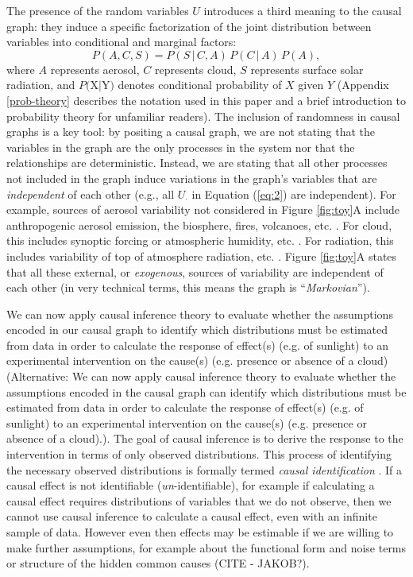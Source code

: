 \documentclass[12pt]{article}
\begin{document}
The presence of the random variables $U$ introduces a third meaning to
the causal graph: they induce a specific factorization of the joint
distribution between variables into conditional and marginal factors:
\begin{equation}
  P(A, C, S) = P(S \, | \,C, A) \, P(C \, | \, A) \, P(A),
\end{equation}
where $A$ represents aerosol, $C$ represents cloud, $S$ represents
surface solar radiation, and $P($X$ | $Y$)$ denotes conditional
probability of $X$ given $Y$ (Appendix \ref{prob-theory} describes the notation used in
this paper and a brief introduction to probability theory for
unfamiliar readers). The inclusion of randomness in causal graphs is a
key tool: by positing a causal graph, we are not stating that the
variables in the graph are the only processes in the system nor that the relationships are deterministic. Instead,
we are stating that all other processes not included in the graph
induce variations in the graph's variables that are \emph{independent} of
each other (e.g., all $U_{\cdot}$ in Equation (\ref{eq:2}) are
independent). For example, sources of aerosol variability not
considered in Figure \ref{fig:toy}A include anthropogenic aerosol
emission, the biosphere, fires, volcanoes,
etc. \citep[e.g.,][]{Boucher2015}. For cloud, this includes synoptic
forcing or atmospheric humidity,
etc. \citep[e.g.,][]{wallace2006atmospheric}. For radiation, this
includes variability of top of atmosphere radiation,
etc. \citep[e.g.,][]{hartmann2015global}. Figure \ref{fig:toy}A states
that all these external, or \textit{exogenous}, sources of variability
are independent of each other (in very technical terms, this means the
graph is ``\textit{Markovian}'').

We can now apply causal inference theory
\citep[e.g.,][]{pearl1995causal,shpitser2006} to evaluate whether the
assumptions encoded in our causal graph to identify which
distributions must be estimated from data in order to calculate the
response of effect(s) (e.g. of sunlight) to an experimental
intervention on the cause(s) (e.g. presence or absence of a cloud)
(Alternative: We can now apply causal inference theory
\citep[e.g.,][]{pearl1995causal,tian2002general} to evaluate whether
the assumptions encoded in the causal graph can identify which
distributions must be estimated from data in order to calculate the
response of effect(s) (e.g. of sunlight) to an experimental
intervention on the cause(s) (e.g. presence or absence of a
cloud).). The goal of causal inference is to derive the response to
the intervention in terms of only observed distributions. This process
of identifying the necessary observed distributions is formally termed
\emph{causal identification} \citep[][, Ch. 3]{pearl2009causality}. If
a causal effect is not identifiable (\emph{un}-identifiable), for
example if calculating a causal effect requires distributions of
variables that we do not observe, then we cannot use causal inference
to calculate a causal effect, even with an infinite sample of
data. However even then effects may be estimable if we are willing to
make further assumptions, for example about the functional form and
noise terms or structure of the hidden common causes (CITE - JAKOB?).
\end{document}
